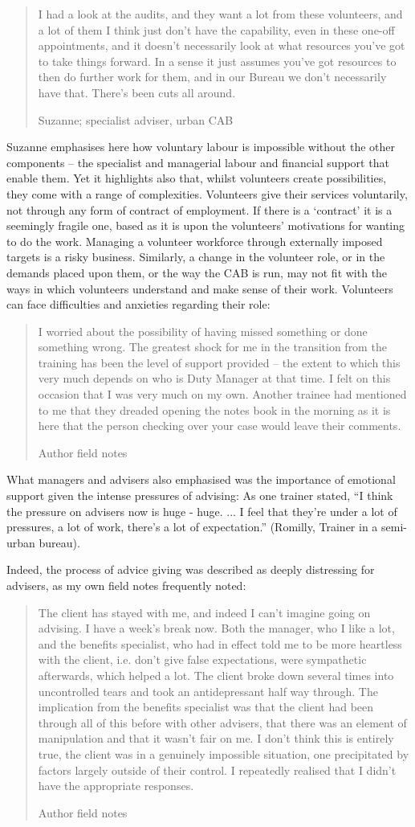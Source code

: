     \blockquote[Suzanne; specialist adviser, urban CAB]{I had a look at the audits, and they want a lot from these volunteers, and a lot of them I think just don’t have the capability, even in these one-off appointments, and it doesn’t necessarily look at what resources you’ve got to take things forward. In a sense it just assumes you’ve got resources to then do further work for them, and in our Bureau we don’t necessarily have that. There’s been cuts all around.}
Suzanne emphasises here how voluntary labour is impossible without the other components – the specialist and managerial labour and financial support that enable them. Yet it highlights also that, whilst volunteers create possibilities, they come with a range of complexities. Volunteers give their services voluntarily, not through any form of contract of employment. If there is a ‘contract’ it is a seemingly fragile one, based as it is upon the volunteers’ motivations for wanting to do the work. Managing a volunteer workforce through externally imposed targets is a risky business. Similarly, a change in the volunteer role, or in the demands placed upon them, or the way the CAB is run, may not fit with the ways in which volunteers understand and make sense of their work. Volunteers can face difficulties and anxieties regarding their role:
    \blockquote[Author field notes]{I worried about the possibility of having missed something or done something wrong. The greatest shock for me in the transition from the training has been the level of support provided – the extent to which this very much depends on who is Duty Manager at that time. I felt on this occasion that I was very much on my own. Another trainee had mentioned to me that they dreaded opening the notes book in the morning as it is here that the person checking over your case would leave their comments.}
What managers and advisers also emphasised was the importance of emotional support given the intense pressures of advising: As one trainer stated, “I think the pressure on advisers now is huge - huge.  ... I feel that they’re under a lot of pressures, a lot of work, there’s a lot of expectation.” (Romilly, Trainer in a semi-urban bureau).
\par
Indeed, the process of advice giving was described as deeply distressing for advisers, as my own field notes frequently noted:
    \blockquote[Author field notes]{The client has stayed with me, and indeed I can’t imagine going on advising. I have a week’s break now. Both the manager, who I like a lot, and the benefits specialist, who had in effect told me to be more heartless with the client, i.e. don’t give false expectations, were sympathetic afterwards, which helped a lot. The client broke down several times into uncontrolled tears and took an antidepressant half way through. The implication from the benefits specialist was that the client had been through all of this before with other advisers, that there was an element of manipulation and that it wasn’t fair on me. I don’t think this is entirely true, the client was in a genuinely impossible situation, one precipitated by factors largely outside of their control. I repeatedly realised that I didn’t have the appropriate responses.}
